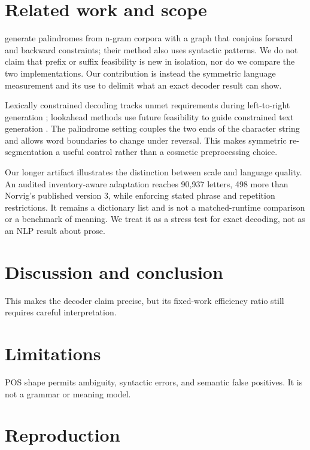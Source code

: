 \documentclass[11pt]{article}
\begin{document}
\section{Related work and scope}

\citet{papadopoulos2015palindromes} generate palindromes from n-gram corpora
with a graph that conjoins forward and backward constraints; their method also
uses syntactic patterns. We do not claim that prefix or suffix feasibility is
new in isolation, nor do we compare the two implementations. Our contribution
is instead the symmetric language measurement and its use to delimit what an
exact decoder result can show.

Lexically constrained decoding tracks unmet requirements during left-to-right
generation \citep{hokamp2017grid,post2018fast}; lookahead methods use future
feasibility to guide constrained text generation \citep{lu2022astar}. The
palindrome setting couples the two ends of the character string and allows word
boundaries to change under reversal. This makes symmetric re-segmentation a
useful control rather than a cosmetic preprocessing choice.

Our longer artifact illustrates the distinction between scale and language
quality. An audited inventory-aware adaptation reaches 90,937 letters, 498
more than Norvig's published version 3, while enforcing stated phrase and
repetition restrictions. It remains a dictionary list and is not a
matched-runtime comparison or a benchmark of meaning. We treat it as a stress
test for exact decoding, not as an NLP result about prose.

\section{Discussion and conclusion}

This makes the decoder claim precise, but its fixed-work efficiency ratio still requires careful interpretation.

\section*{Limitations}

POS shape permits ambiguity, syntactic errors, and semantic false positives. It is not a grammar or meaning model.



\appendix
\section{Reproduction}
\end{document}

